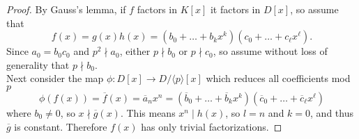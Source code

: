 \documentclass{article}
\newcommand{\ang}[1]{\langle #1 \rangle}
\newcommand{\fn}[3]{#1 \colon #2 \rightarrow #3}
\begin{document}
\begin{proof}
  By Gauss's lemma, if $f$ factors in $K[x]$ it factors in $D[x]$, so assume
  that \[
    f(x) = g(x)h(x) = (b_0 + \hdots + b_k x^k)(c_0 + \hdots + c_\ell x^\ell).
  \]
  Since $a_0 = b_0c_0$ and $p^2 \nmid a_0$, either $p \nmid b_0$ or
  $p \nmid c_0$, so assume without loss of generality that $p \nmid b_0$.
  \\
  Next consider the map $\fn{\phi}{D[x]}{D/\ang p[x]}$ which reduces all
  coefficients mod $p$ \[
    \phi(f(x))
    = \overline f(x)
    = \overline a_n x^n
    = (\overline b_0 + \hdots + \overline b_k x^k)
    (\overline c_0 + \hdots + \overline c_\ell x^\ell)
  \] where $b_0 \neq 0$, so $x \nmid \overline g(x)$. This means
  $x^n \mid h(x)$, so $l = n$ and $k = 0$, and thus $\overline g$ is constant.
  Therefore $f(x)$ has only trivial factorizations.
\end{proof}
\end{document}
